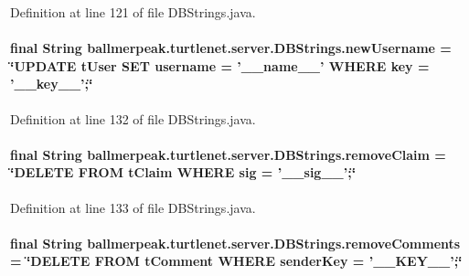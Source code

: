 Definition at line 121 of file D\-B\-Strings.\-java.

\hypertarget{classballmerpeak_1_1turtlenet_1_1server_1_1DBStrings_a9561d2bc731daafe8e20cb46dc51cfb6}{
\paragraph[{new\-Username}]{\setlength{\rightskip}{0pt plus 5cm}final String ballmerpeak.\-turtlenet.\-server.\-D\-B\-Strings.\-new\-Username = \char`\"{}U\-P\-D\-A\-T\-E t\-User S\-E\-T username = '\-\_\-\-\_\-name\-\_\-\-\_\-' W\-H\-E\-R\-E key = '\-\_\-\-\_\-key\-\_\-\-\_\-';\char`\"{}\hspace{0.3cm}{\ttfamily [static]}}}\label{classballmerpeak_1_1turtlenet_1_1server_1_1DBStrings_a9561d2bc731daafe8e20cb46dc51cfb6}


Definition at line 132 of file D\-B\-Strings.\-java.

\hypertarget{classballmerpeak_1_1turtlenet_1_1server_1_1DBStrings_a01691bb9e0418b279a1eb0bcddb94b14}{
\paragraph[{remove\-Claim}]{\setlength{\rightskip}{0pt plus 5cm}final String ballmerpeak.\-turtlenet.\-server.\-D\-B\-Strings.\-remove\-Claim = \char`\"{}D\-E\-L\-E\-T\-E F\-R\-O\-M t\-Claim W\-H\-E\-R\-E sig = '\-\_\-\-\_\-sig\-\_\-\-\_\-';\char`\"{}\hspace{0.3cm}{\ttfamily [static]}}}\label{classballmerpeak_1_1turtlenet_1_1server_1_1DBStrings_a01691bb9e0418b279a1eb0bcddb94b14}


Definition at line 133 of file D\-B\-Strings.\-java.

\hypertarget{classballmerpeak_1_1turtlenet_1_1server_1_1DBStrings_a54bb85c47ce1672a4adecc4104caa10e}{
\paragraph[{remove\-Comments}]{\setlength{\rightskip}{0pt plus 5cm}final String ballmerpeak.\-turtlenet.\-server.\-D\-B\-Strings.\-remove\-Comments = \char`\"{}D\-E\-L\-E\-T\-E F\-R\-O\-M t\-Comment W\-H\-E\-R\-E sender\-Key = '\-\_\-\-\_\-\-K\-E\-Y\-\_\-\-\_\-';\char`\"{}\hspace{0.3cm}{\ttfamily [static]}}}\label{classballmerpeak_1_1turtlenet_1_1server_1_1DBStrings_a54bb85c47ce1672a4adecc4104caa10e}


